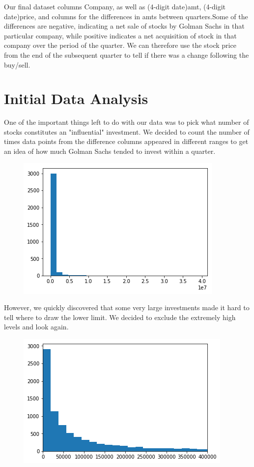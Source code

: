 \documentclass{article}
\begin{document}
Our final dataset columns Company, as well as (4-digit date)amt, (4-digit date)price, and columns for the differences in amts between quarters.Some of the differences are negative, indicating a net sale of stocks by Golman Sachs in that particular company, while positive indicates a net acquisition of stock in that company over the period of the quarter. We can therefore use the stock price from the end of the subsequent quarter to tell if there was a change following the buy/sell.\\

\section*{Initial Data Analysis}

One of the important things left to do with our data was to pick what number of stocks constitutes an "influential" investment. We decided to count the number of times data points from the difference columns appeared in different ranges to get an idea of how much Golman Sachs tended to invest within a quarter. \\
\begin{figure}[H]
\includegraphics{Unknown.png}
\end{figure}
However, we quickly discovered that some very large investments made it hard to tell where to draw the lower limit. We decided to exclude the extremely high levels and look again.\\
\begin{figure}[H]
\includegraphics{histogram2.png}
\end{figure}
\end{document}

